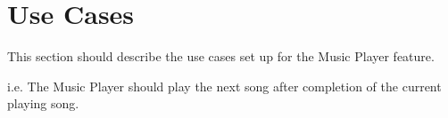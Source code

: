 \section{Use Cases}
This section should describe the use cases set up for the Music Player feature.

i.e. The Music Player should play the next song after completion of the current playing song.